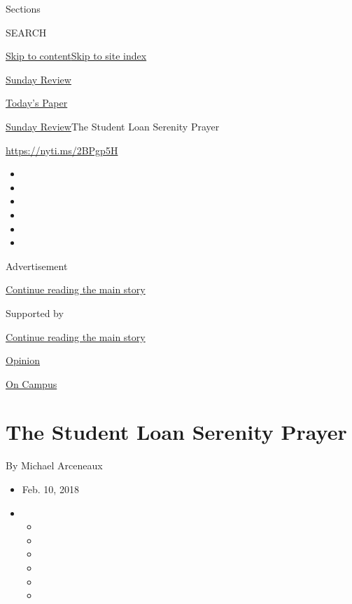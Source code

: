 Sections

SEARCH

\protect\hyperlink{site-content}{Skip to
content}\protect\hyperlink{site-index}{Skip to site index}

\href{https://www.nytimes.com/section/opinion/sunday}{Sunday Review}

\href{https://myaccount.nytimes.com/auth/login?response_type=cookie\&client_id=vi}{}

\href{https://www.nytimes.com/section/todayspaper}{Today's Paper}

\href{/section/opinion/sunday}{Sunday Review}\textbar{}The Student Loan
Serenity Prayer

\href{https://nyti.ms/2BPgp5H}{https://nyti.ms/2BPgp5H}

\begin{itemize}
\item
\item
\item
\item
\item
\item
\end{itemize}

Advertisement

\protect\hyperlink{after-top}{Continue reading the main story}

Supported by

\protect\hyperlink{after-sponsor}{Continue reading the main story}

\href{/section/opinion}{Opinion}

\href{/column/on-campus}{On Campus}

\hypertarget{the-student-loan-serenity-prayer}{%
\section{The Student Loan Serenity
Prayer}\label{the-student-loan-serenity-prayer}}

By Michael Arceneaux

\begin{itemize}
\item
  Feb. 10, 2018
\item
  \begin{itemize}
  \item
  \item
  \item
  \item
  \item
  \item
  \end{itemize}
\end{itemize}

